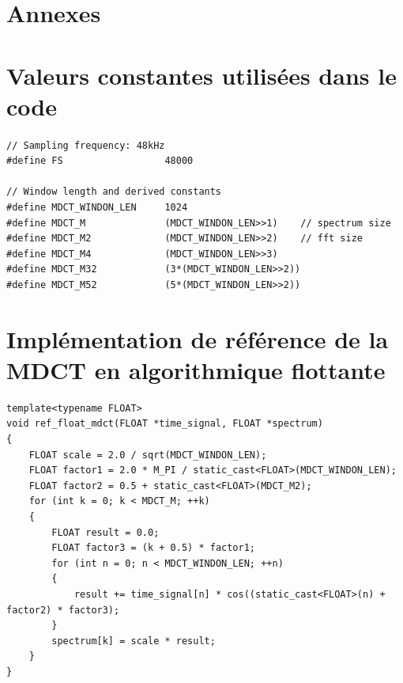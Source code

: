 \documentclass{article}
\begin{document}
    \section*{Annexes}
    \begin{appendix}
        \section{Valeurs constantes utilisées dans le code}
        \label{an:mdct_const}
        \paragraph{}
        \begin{lstlisting}
// Sampling frequency: 48kHz
#define FS                  48000

// Window length and derived constants
#define MDCT_WINDON_LEN     1024
#define MDCT_M              (MDCT_WINDON_LEN>>1)    // spectrum size
#define MDCT_M2             (MDCT_WINDON_LEN>>2)    // fft size
#define MDCT_M4             (MDCT_WINDON_LEN>>3)
#define MDCT_M32            (3*(MDCT_WINDON_LEN>>2))
#define MDCT_M52            (5*(MDCT_WINDON_LEN>>2))
        \end{lstlisting}



        \section{Implémentation de référence de la MDCT en algorithmique flottante}
        \label{an:ref_float_mdct}
        \begin{lstlisting}
template<typename FLOAT>
void ref_float_mdct(FLOAT *time_signal, FLOAT *spectrum)
{
    FLOAT scale = 2.0 / sqrt(MDCT_WINDON_LEN);
    FLOAT factor1 = 2.0 * M_PI / static_cast<FLOAT>(MDCT_WINDON_LEN);
    FLOAT factor2 = 0.5 + static_cast<FLOAT>(MDCT_M2);
    for (int k = 0; k < MDCT_M; ++k)
    {
        FLOAT result = 0.0;
        FLOAT factor3 = (k + 0.5) * factor1;
        for (int n = 0; n < MDCT_WINDON_LEN; ++n)
        {
            result += time_signal[n] * cos((static_cast<FLOAT>(n) + factor2) * factor3);
        }
        spectrum[k] = scale * result;
    }
}
        \end{lstlisting}




\end{appendix}
\end{document}
